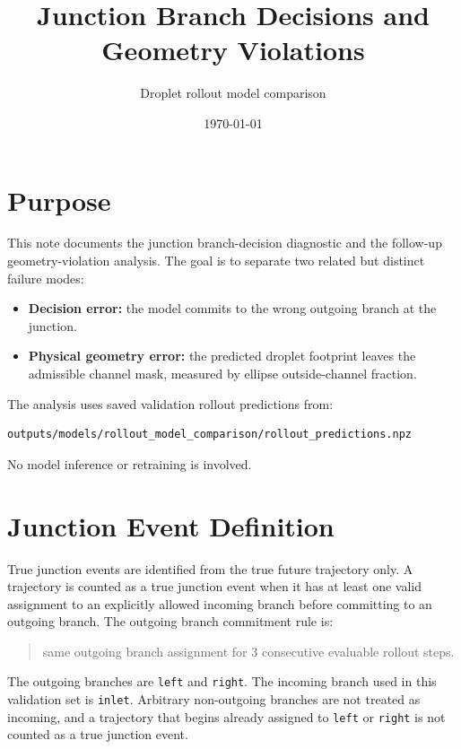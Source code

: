 \documentclass[11pt]{article}
\title{Junction Branch Decisions and Geometry Violations}
\author{Droplet rollout model comparison}
\date{\today}
\begin{document}
\maketitle

\section{Purpose}

This note documents the junction branch-decision diagnostic and the follow-up
geometry-violation analysis.  The goal is to separate two related but distinct
failure modes:

\begin{itemize}
  \item \textbf{Decision error:} the model commits to the wrong outgoing branch
  at the junction.
  \item \textbf{Physical geometry error:} the predicted droplet footprint leaves
  the admissible channel mask, measured by ellipse outside-channel fraction.
\end{itemize}

The analysis uses saved validation rollout predictions from:
\begin{verbatim}
outputs/models/rollout_model_comparison/rollout_predictions.npz
\end{verbatim}

No model inference or retraining is involved.

\section{Junction Event Definition}

True junction events are identified from the true future trajectory only.  A
trajectory is counted as a true junction event when it has at least one valid
assignment to an explicitly allowed incoming branch before committing to an
outgoing branch.  The outgoing branch commitment rule is:

\begin{quote}
same outgoing branch assignment for 3 consecutive evaluable rollout steps.
\end{quote}

The outgoing branches are \texttt{left} and \texttt{right}.  The incoming branch
used in this validation set is \texttt{inlet}.  Arbitrary non-outgoing branches
are not treated as incoming, and a trajectory that begins already assigned to
\texttt{left} or \texttt{right} is not counted as a true junction event.
\end{document}
